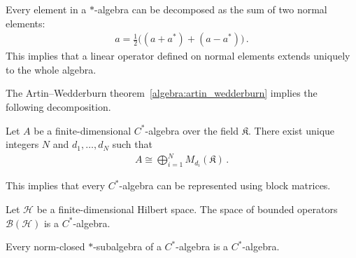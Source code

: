     \begin{property}
        Every element in a $\ast$-algebra can be decomposed as the sum of two normal elements:
        \begin{gather}
            a = \frac{1}{2}\bigl((a+a^*) + (a-a^*)\bigr)\,.
        \end{gather}
        This implies that a linear operator defined on normal elements extends uniquely to the whole algebra.
    \end{property}



    The Artin--Wedderburn theorem~\ref{algebra:artin_wedderburn} implies the following decomposition.
    \begin{theorem}
        Let $A$ be a finite-dimensional $C^*$-algebra over the field $\mathfrak{K}$. There exist unique integers $N$ and $d_1,\ldots,d_N$ such that
        \begin{gather}
            A\cong\bigoplus_{i=1}^NM_{d_i}(\mathfrak{K})\,.
        \end{gather}
    \end{theorem}
    This implies that every $C^*$-algebra can be represented using block matrices.

    \begin{example}\label{operators:bounded_operators}
        Let $\mathcal{H}$ be a finite-dimensional Hilbert space. The space of bounded operators $\mathcal{B}(\mathcal{H})$ is a $C^*$-algebra.
    \end{example}

    \begin{property}
        Every norm-closed $\ast$-subalgebra of a $C^*$-algebra is a $C^*$-algebra.
    \end{property}


